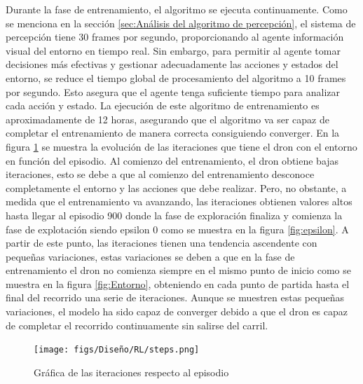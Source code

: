 Durante la fase de entrenamiento, el algoritmo se ejecuta continuamente. Como se menciona en la sección \ref{sec:Análisis del algoritmo de percepción}, el sistema de percepción tiene 30 frames por
segundo, proporcionando al agente información visual del entorno en tiempo real. Sin embargo, para permitir al agente tomar decisiones más efectivas y gestionar adecuadamente las acciones 
y estados del entorno, se reduce el tiempo global de procesamiento del algoritmo a 10 frames por segundo. Esto asegura que el agente tenga suficiente tiempo para analizar cada acción y estado. La ejecución de este 
algoritmo de entrenamiento es aproximadamente de 12 horas, asegurando que el algoritmo va ser capaz de completar el entrenamiento de manera correcta consiguiendo converger. En la figura \ref{fig:iteraciones} 
se muestra la evolución de las iteraciones que tiene el dron con el entorno en función del episodio. Al comienzo del entrenamiento, el dron obtiene bajas iteraciones, esto se debe a que 
al comienzo del entrenamiento desconoce completamente el entorno y las acciones que debe realizar. Pero, no obstante, a medida que el entrenamiento va avanzando, 
las iteraciones obtienen valores altos hasta llegar al episodio
900 donde la fase de exploración finaliza y comienza la fase de explotación siendo epsilon 0 como se muestra en la figura \ref{fig:epsilon}. A partir de este punto, las iteraciones tienen 
una tendencia ascendente con pequeñas variaciones, estas variaciones se deben a que en la fase de entrenamiento el dron no comienza siempre en el mismo punto de inicio como 
se muestra en la figura \ref{fig:Entorno}, obteniendo en cada punto de partida hasta el final del recorrido una serie de iteraciones. Aunque se muestren estas pequeñas variaciones, el modelo
ha sido capaz de converger debido a que el dron es capaz de completar el recorrido continuamente sin salirse del carril.

\begin{figure} [H]
  \begin{center}
    \texttt{[image: figs/Diseño/RL/steps.png]}
  \end{center}
  \caption{Gráfica de las iteraciones respecto al episodio}
  \label{fig:iteraciones}
\end{figure}


